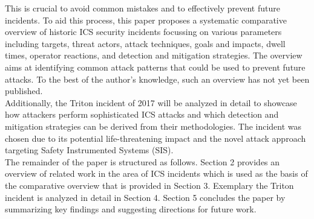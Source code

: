 \documentclass[runningheads]{llncs}
\begin{document}
This is crucial to avoid common mistakes and to effectively prevent future incidents.
To aid this process, this paper proposes a systematic comparative overview of historic ICS security incidents focussing on various parameters including targets, threat actors, attack techniques, goals and impacts, dwell times, operator reactions, and detection and mitigation strategies.
The overview aims at identifying common attack patterns that could be used to prevent future attacks.
To the best of the author's knowledge, such an overview has not yet been published.\\
Additionally, the Triton incident of 2017 will be analyzed in detail to showcase how attackers perform sophisticated ICS attacks and which detection and mitigation strategies can be derived from their methodologies.
The incident was chosen due to its potential life-threatening impact and the novel attack approach targeting Safety Instrumented Systems (SIS).\\
The remainder of the paper is structured as follows.
Section 2 provides an overview of related work in the area of ICS incidents which is used as the basis of the comparative overview that is provided in Section 3.
Exemplary the Triton incident is analyzed in detail in Section 4.
Section 5 concludes the paper by summarizing key findings and suggesting directions for future work.
\end{document}
